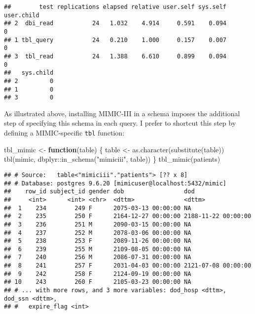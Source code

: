 \documentclass[
]{article}
\newenvironment{Shaded}{\begin{snugshade}}{\end{snugshade}}
\newcommand{\ControlFlowTok}[1]{\textcolor[rgb]{0.13,0.29,0.53}{\textbf{#1}}}
\newcommand{\FunctionTok}[1]{\textcolor[rgb]{0.00,0.00,0.00}{#1}}
\newcommand{\NormalTok}[1]{#1}
\newcommand{\OtherTok}[1]{\textcolor[rgb]{0.56,0.35,0.01}{#1}}
\newcommand{\SpecialCharTok}[1]{\textcolor[rgb]{0.00,0.00,0.00}{#1}}
\newcommand{\StringTok}[1]{\textcolor[rgb]{0.31,0.60,0.02}{#1}}
\begin{document}
\begin{verbatim}
##        test replications elapsed relative user.self sys.self user.child
## 2  dbi_read           24   1.032    4.914     0.591    0.094          0
## 1 tbl_query           24   0.210    1.000     0.157    0.007          0
## 3  tbl_read           24   1.388    6.610     0.899    0.094          0
##   sys.child
## 2         0
## 1         0
## 3         0
\end{verbatim}

As illustrated above, installing MIMIC-III in a schema imposes the
additional step of specifying this schema in each query. I prefer to
shortcut this step by defining a MIMIC-specific \texttt{tbl} function:

\begin{Shaded}
\begin{Highlighting}[]
\NormalTok{tbl\_mimic }\OtherTok{\textless{}{-}} \ControlFlowTok{function}\NormalTok{(table) \{}
\NormalTok{  table }\OtherTok{\textless{}{-}} \FunctionTok{as.character}\NormalTok{(}\FunctionTok{substitute}\NormalTok{(table))}
  \FunctionTok{tbl}\NormalTok{(mimic, dbplyr}\SpecialCharTok{::}\FunctionTok{in\_schema}\NormalTok{(}\StringTok{"mimiciii"}\NormalTok{, table))}
\NormalTok{\}}
\FunctionTok{tbl\_mimic}\NormalTok{(patients)}
\end{Highlighting}
\end{Shaded}

\begin{verbatim}
## # Source:   table<"mimiciii"."patients"> [?? x 8]
## # Database: postgres 9.6.20 [mimicuser@localhost:5432/mimic]
##    row_id subject_id gender dob                 dod                
##     <int>      <int> <chr>  <dttm>              <dttm>             
##  1    234        249 F      2075-03-13 00:00:00 NA                 
##  2    235        250 F      2164-12-27 00:00:00 2188-11-22 00:00:00
##  3    236        251 M      2090-03-15 00:00:00 NA                 
##  4    237        252 M      2078-03-06 00:00:00 NA                 
##  5    238        253 F      2089-11-26 00:00:00 NA                 
##  6    239        255 M      2109-08-05 00:00:00 NA                 
##  7    240        256 M      2086-07-31 00:00:00 NA                 
##  8    241        257 F      2031-04-03 00:00:00 2121-07-08 00:00:00
##  9    242        258 F      2124-09-19 00:00:00 NA                 
## 10    243        260 F      2105-03-23 00:00:00 NA                 
## # ... with more rows, and 3 more variables: dod_hosp <dttm>, dod_ssn <dttm>,
## #   expire_flag <int>
\end{verbatim}
\end{document}
